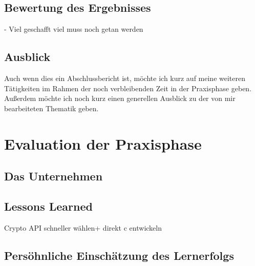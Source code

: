 \subsection{Bewertung des Ergebnisses} 

- Viel geschafft 
viel muss noch getan werden
\subsection{Ausblick}
Auch wenn dies ein Abschlussbericht ist, möchte ich kurz auf meine weiteren Tätigkeiten im Rahmen der noch verbleibenden Zeit in der Praxisphase geben. Außerdem möchte ich noch kurz einen generellen Ausblick zu der von mir bearbeiteten Thematik geben. 

\section{Evaluation der Praxisphase}
\subsection{Das Unternehmen}
\subsection{Lessons Learned}
Crypto API schneller wählen+
direkt c entwickeln
\subsection{Persöhnliche Einschätzung des Lernerfolgs}



